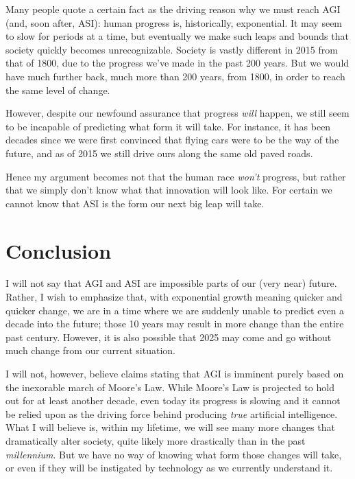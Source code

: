 \documentclass[12pt]{article} %
\begin{document}
Many people quote a certain fact as the driving reason why we must reach AGI (and, soon after, ASI): human progress is, historically, exponential\cite{wbw}. It may seem to slow for periods at a time, but eventually we make such leaps and bounds that society quickly becomes unrecognizable. Society is vastly different in 2015 from that of 1800, due to the progress we've made in the past 200 years. But we would have much further back, much more than 200 years, from 1800, in order to reach the same level of change.

However, despite our newfound assurance that progress \textit{will} happen, we still seem to be incapable of predicting what form it will take. For instance, it has been decades since we were first convinced that flying cars were to be the way of the future, and as of 2015 we still drive ours along the same old paved roads.

Hence my argument becomes not that the human race \textit{won't} progress, but rather that we simply don't know what that innovation will look like. For certain we cannot know that ASI is the form our next big leap will take.


\section{Conclusion} %

I will not say that AGI and ASI are impossible parts of our (very near) future. Rather, I wish to emphasize that, with exponential growth meaning quicker and quicker change, we are in a time where we are suddenly unable to predict even a decade into the future; those 10 years may result in more change than the entire past century. However, it is also possible that 2025 may come and go without much change from our current situation.

I will not, however, believe claims stating that AGI is imminent purely based on the inexorable march of Moore's Law. While Moore's Law is projected to hold out for at least another decade, even today its progress is slowing and it cannot be relied upon as the driving force behind producing \textit{true} artificial intelligence. What I will believe is, within my lifetime, we will see many more changes that dramatically alter society, quite likely more drastically than in the past \textit{millennium}. But we have no way of knowing what form those changes will take, or even if they will be instigated by technology as we currently understand it.
\end{document}
